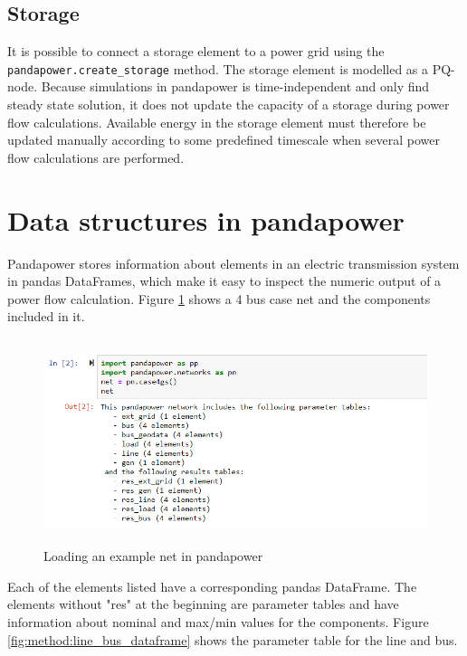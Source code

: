 \documentclass[class=book, crop=false]{standalone}
\begin{document}
\subsection{Storage}
It is possible to connect a storage element to a power grid using the \texttt{pandapower.create\_storage} method. The storage element is modelled as a PQ-node. Because simulations in pandapower is time-independent and only find steady state solution, it does not update the capacity of a storage during power flow calculations. Available energy in the storage element must therefore be updated manually according to some predefined timescale when several power flow calculations are performed.  


\section{Data structures in pandapower}

Pandapower stores information about elements in an electric transmission system in pandas DataFrames, which make it easy to inspect the numeric output of a power flow calculation. Figure \ref{fig:method:loading_example_net} shows a 4 bus case net and the components included in it. 

\begin{figure}[H]
    \center
    \includegraphics[height=6cm, width=12cm]{figures/case4g_show_net.PNG}
    \caption[size = 9]{Loading an example net in pandapower}
    \label{fig:method:loading_example_net}
\end{figure}
Each of the elements listed have a corresponding pandas DataFrame. The elements without "res" at the beginning are parameter tables and have information about nominal and max/min values for the components. Figure \ref{fig:method:line_bus_dataframe} shows the parameter table for the line and bus.
\end{document}
